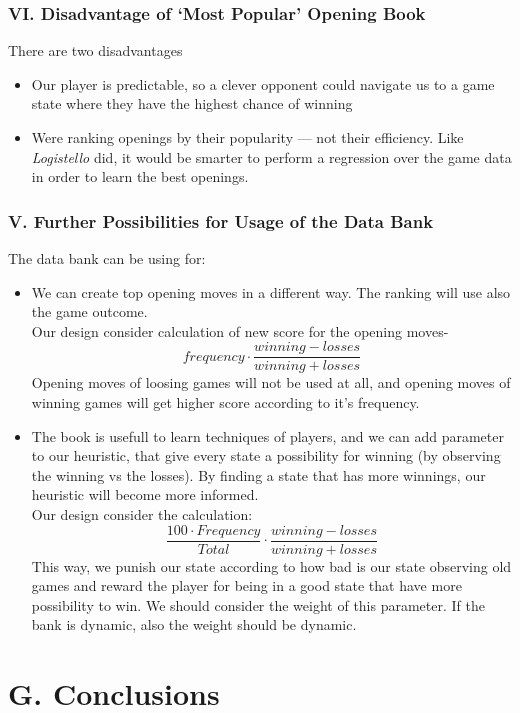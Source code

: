 \documentclass{article}
\begin{document}
\subsubsection*{VI. Disadvantage of `Most Popular' Opening Book}
There are two disadvantages
\begin{itemize}
\item Our player is predictable, so a clever opponent could navigate us to a game state where they have the highest chance of winning
\item Were ranking openings by their popularity --- not their efficiency. Like \emph{Logistello} did, it would be smarter to perform a regression over the game data in order to learn the best openings.
\end{itemize}

\subsubsection*{V. Further Possibilities for Usage of the Data Bank}
The data bank can be using for:
\begin{itemize}
\item We can create top opening moves in a different way. The ranking will use also the game outcome.\\
Our design consider calculation of new score for the opening moves-
$$frequency \cdot \frac {winning - losses}{winning+ losses} $$
Opening moves of loosing games will not be used at all, and opening moves of winning games will get higher score according to it's frequency.
\item The book is usefull to learn techniques of players, and we can add parameter to our heuristic, that give every state a possibility for winning (by observing the winning vs the losses). By finding a state that has more winnings, our  heuristic will become more informed.\\
Our design consider the calculation:
$$\frac {100 \cdot Frequency}{Total} \cdot \frac {winning - losses}{winning+ losses} $$
This way, we punish our state according to how bad is our state observing old games and reward the player for being in a good state that have more possibility to win. We should consider the weight of this parameter. If the bank is dynamic, also the weight should be dynamic.
\end{itemize}

\section*{G. Conclusions}
\end{document}
